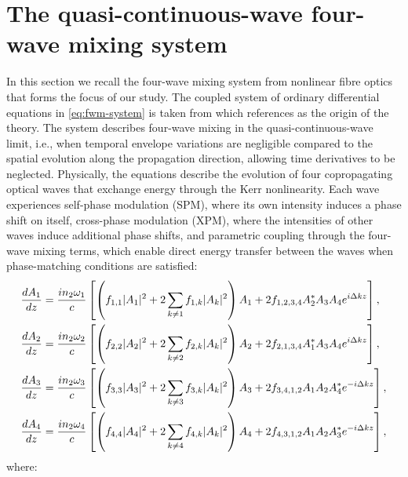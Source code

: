 \documentclass[11pt,a4paper]{article}
\numberwithin{equation}{section}
\begin{document}
\section{The quasi-continuous-wave four-wave mixing system}
In this section we recall the four-wave mixing system from nonlinear fibre optics that forms the focus of our study.
The coupled system of ordinary differential equations in \eqref{eq:fwm-system} is taken from \cite{agrawalNonlinearFiberOptics2019} which references \cite{stolenParametricAmplificationFrequency1982} as the origin of the theory.
The system describes four-wave mixing in the quasi-continuous-wave limit, i.e., when temporal envelope variations are negligible compared to the spatial evolution along the propagation direction, allowing time derivatives to be neglected.
Physically, the equations describe the evolution of four copropagating optical waves that exchange energy through the Kerr nonlinearity.
Each wave experiences self-phase modulation (SPM), where its own intensity induces a phase shift on itself, cross-phase modulation (XPM), where the intensities of other waves induce additional phase shifts, and parametric coupling through the four-wave mixing terms, which enable direct energy transfer between the waves when phase-matching conditions are satisfied:
\begin{align}
\frac{dA_1}{dz} &= \frac{in_2\omega_1}{c}\left[\left(f_{1,1}|A_1|^2 + 2\sum_{k\neq 1} f_{1,k}|A_k|^2\right)A_1 + 2f_{1,2,3,4}A_2^*A_3A_4e^{i\Delta kz}\right], \notag \\
\frac{dA_2}{dz} &= \frac{in_2\omega_2}{c}\left[\left(f_{2,2}|A_2|^2 + 2\sum_{k\neq 2} f_{2,k}|A_k|^2\right)A_2 + 2f_{2,1,3,4}A_1^*A_3A_4e^{i\Delta kz}\right], \notag \\
\frac{dA_3}{dz} &= \frac{in_2\omega_3}{c}\left[\left(f_{3,3}|A_3|^2 + 2\sum_{k\neq 3} f_{3,k}|A_k|^2\right)A_3 + 2f_{3,4,1,2}A_1A_2A_4^*e^{-i\Delta kz}\right], \notag \\
\frac{dA_4}{dz} &= \frac{in_2\omega_4}{c}\left[\left(f_{4,4}|A_4|^2 + 2\sum_{k\neq 4} f_{4,k}|A_k|^2\right)A_4 + 2f_{4,3,1,2}A_1A_2A_3^*e^{-i\Delta kz}\right], \label{eq:fwm-system}
\end{align}
where:
\end{document}
